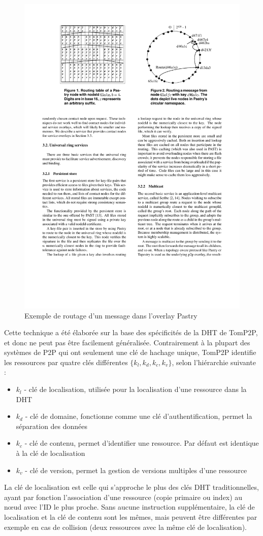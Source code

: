 \begin{figure}[!ht]
	\centering
	\includegraphics[width=0.4\linewidth]{img/AnneauPastry.pdf}
	\caption{Exemple de routage d'un message dans l'overlay Pastry \cite{Castro2002}}
	\label{fig:pastry}
\end{figure}


Cette technique a été élaborée sur la base des spécificités de la DHT de TomP2P, et donc ne peut pas être facilement généralisée. Contrairement à la plupart des systèmes de P2P qui ont seulement une clé de hachage unique, TomP2P identifie les ressources par quatre clés différentes $\{k_l,k_d,k_c,k_v\}$, selon l'hiérarchie suivante : 
\begin{itemize}
	\item \textit{$k_l$} - clé de localisation, utilisée pour la localisation d'une ressource dans la DHT
	\item \textit{$k_d$} - clé de domaine, fonctionne comme une clé d'authentification, permet la séparation des données
	\item \textit{$k_c$} - clé de contenu, permet d'identifier une ressource. Par défaut est identique à la clé de localisation 
	\item \textit{$k_v$} - clé de version, permet la gestion de versions multiples d'une ressource
\end{itemize} 

La clé de localisation est celle qui s'approche le plus des clés DHT traditionnelles, ayant par fonction l'association d'une ressource (copie primaire ou index) au n{\oe}ud avec l'ID le plus proche. Sans aucune instruction supplémentaire, la clé de localisation et la clé de contenu sont les mêmes, mais peuvent être différentes par exemple en cas de collision (deux ressources avec la même clé de localisation).

